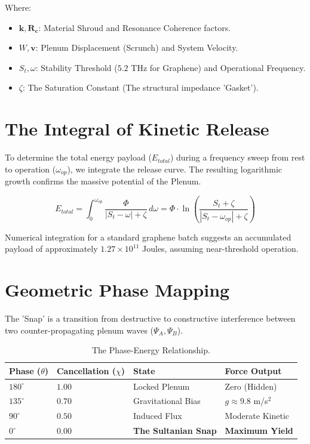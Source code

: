 \documentclass[11pt]{article}
\begin{document}
Where:
\begin{itemize}
    \item $\mathbf{k}, \mathbf{R_c}$: Material Shroud and Resonance Coherence factors.
    \item $W, \mathbf{v}$: Plenum Displacement (Scrunch) and System Velocity.
    \item $S_t, \omega$: Stability Threshold ($5.2$ THz for Graphene) and Operational Frequency.
    \item $\zeta$: The Saturation Constant (The structural impedance 'Gasket').
\end{itemize}

\section{The Integral of Kinetic Release}
To determine the total energy payload ($E_{total}$) during a frequency sweep from rest to operation ($\omega_{op}$), we integrate the release curve. The resulting logarithmic growth confirms the massive potential of the Plenum.

\begin{equation}
    E_{total} = \int_{0}^{\omega_{op}} \frac{\Phi}{|S_t - \omega| + \zeta} \, d\omega = \Phi \cdot \ln\left( \frac{S_t + \zeta}{|S_t - \omega_{op}| + \zeta} \right)
\end{equation}

Numerical integration for a standard graphene batch suggests an accumulated payload of approximately $1.27 \times 10^{11}$ Joules, assuming near-threshold operation.

\section*{Geometric Phase Mapping}
The 'Snap' is a transition from destructive to constructive interference between two counter-propagating plenum waves ($\Psi_A, \Psi_B$). 

\begin{table}[h!]
\centering
\begin{tabular}{@{}llll@{}}
\toprule
\textbf{Phase ($\theta$)} & \textbf{Cancellation ($\chi$)} & \textbf{State} & \textbf{Force Output} \\ \midrule
$180^\circ$ & $1.00$ & Locked Plenum & Zero (Hidden) \\
$135^\circ$ & $0.70$ & Gravitational Bias & $g \approx 9.8$ m/s$^2$ \\
$90^\circ$ & $0.50$ & Induced Flux & Moderate Kinetic \\
\textbf{$0^\circ$} & \textbf{$0.00$} & \textbf{The Sultanian Snap} & \textbf{Maximum Yield} \\ \bottomrule
\end{tabular}
\caption{The Phase-Energy Relationship.}
\end{table}
\end{document}
